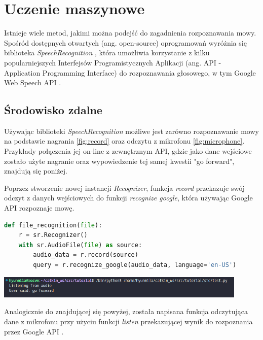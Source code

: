 \chapter{Uczenie maszynowe}
\label{cha:uczenieMaszynowe}

Istnieje wiele metod, jakimi można podejść do zagadnienia rozpoznawania mowy. Spośród dostępnych otwartych (ang. open-source) oprogramowań wyróżnia się biblioteka \textit{SpeechRecognition} \cite{speechrec}, która umożliwia korzystanie z kilku popularniejszych Interfejsów Programistycznych Aplikacji (ang. API - Application Programming Interface) do rozpoznawania głosowego, w tym Google Web Speech API \cite{webspeech}. 


\section{Środowisko zdalne}
\label{sec:srodZdal}

Używając biblioteki \textit{SpeechRecognition} możliwe jest zarówno rozpoznawanie mowy na podstawie nagrania \ref{fig:record} oraz odczytu z mikrofonu \ref{fig:microphone}. Przykłady połączenia jej on-line z zewnętrznym API, gdzie jako dane wejściowe zostało użyte nagranie oraz wypowiedzenie tej samej kwestii "go forward", znajdują się poniżej.

Poprzez stworzenie nowej instancji \textit{Recognizer}, funkcja \textit{record} przekazuje swój odczyt z danych wejściowych do funkcji \textit{recognize google}, która używając Google API \cite{webspeech} rozpoznaje mowę.

\begin{lstlisting}[language=Python]
def file_recognition(file):
    r = sr.Recognizer()
    with sr.AudioFile(file) as source:
        audio_data = r.record(source)
        query = r.recognize_google(audio_data, language='en-US')
\end{lstlisting}

\begin{center}
    \includegraphics[width=12cm]{files/record.png}
    \label{fig:record}
\end{center}

Analogicznie do znajdującej się powyżej, została napisana funkcja odczytująca dane z mikrofonu przy użyciu funkcji \textit{listen} przekazującej wynik do rozpoznania przez Google API \cite{webspeech}.

